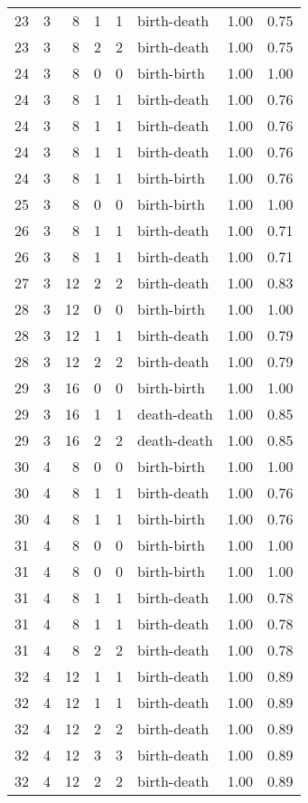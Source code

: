 \documentclass{article}
\begin{document}
\begin{center}
\begin{tabular}{rrrrrlrr}
23 & 3 & 8 & 1 & 1 & birth-death & 1.00 & 0.75 \\
23 & 3 & 8 & 2 & 2 & birth-death & 1.00 & 0.75 \\
24 & 3 & 8 & 0 & 0 & birth-birth & 1.00 & 1.00 \\
24 & 3 & 8 & 1 & 1 & birth-death & 1.00 & 0.76 \\
24 & 3 & 8 & 1 & 1 & birth-death & 1.00 & 0.76 \\
24 & 3 & 8 & 1 & 1 & birth-death & 1.00 & 0.76 \\
24 & 3 & 8 & 1 & 1 & birth-birth & 1.00 & 0.76 \\
25 & 3 & 8 & 0 & 0 & birth-birth & 1.00 & 1.00 \\
26 & 3 & 8 & 1 & 1 & birth-death & 1.00 & 0.71 \\
26 & 3 & 8 & 1 & 1 & birth-death & 1.00 & 0.71 \\
27 & 3 & 12 & 2 & 2 & birth-death & 1.00 & 0.83 \\
28 & 3 & 12 & 0 & 0 & birth-birth & 1.00 & 1.00 \\
28 & 3 & 12 & 1 & 1 & birth-death & 1.00 & 0.79 \\
28 & 3 & 12 & 2 & 2 & birth-death & 1.00 & 0.79 \\
29 & 3 & 16 & 0 & 0 & birth-birth & 1.00 & 1.00 \\
29 & 3 & 16 & 1 & 1 & death-death & 1.00 & 0.85 \\
29 & 3 & 16 & 2 & 2 & death-death & 1.00 & 0.85 \\
30 & 4 & 8 & 0 & 0 & birth-birth & 1.00 & 1.00 \\
30 & 4 & 8 & 1 & 1 & birth-death & 1.00 & 0.76 \\
30 & 4 & 8 & 1 & 1 & birth-birth & 1.00 & 0.76 \\
31 & 4 & 8 & 0 & 0 & birth-birth & 1.00 & 1.00 \\
31 & 4 & 8 & 0 & 0 & birth-birth & 1.00 & 1.00 \\
31 & 4 & 8 & 1 & 1 & birth-death & 1.00 & 0.78 \\
31 & 4 & 8 & 1 & 1 & birth-death & 1.00 & 0.78 \\
31 & 4 & 8 & 2 & 2 & birth-death & 1.00 & 0.78 \\
32 & 4 & 12 & 1 & 1 & birth-death & 1.00 & 0.89 \\
32 & 4 & 12 & 1 & 1 & birth-death & 1.00 & 0.89 \\
32 & 4 & 12 & 2 & 2 & birth-death & 1.00 & 0.89 \\
32 & 4 & 12 & 3 & 3 & birth-death & 1.00 & 0.89 \\
32 & 4 & 12 & 2 & 2 & birth-death & 1.00 & 0.89 \\
\bottomrule
\end{tabular}
\end{center}
\end{document}

